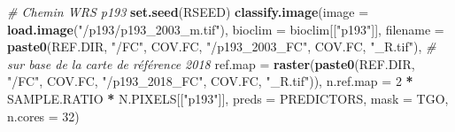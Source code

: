 \documentclass[a4paper, notitlepage, 12pt, krantz2]{krantz}
\newenvironment{Shaded}{\begin{snugshade}}{\end{snugshade}}
\newcommand{\CommentTok}[1]{\textcolor[rgb]{0.56,0.35,0.01}{\textit{#1}}}
\newcommand{\DataTypeTok}[1]{\textcolor[rgb]{0.13,0.29,0.53}{#1}}
\newcommand{\DecValTok}[1]{\textcolor[rgb]{0.00,0.00,0.81}{#1}}
\newcommand{\KeywordTok}[1]{\textcolor[rgb]{0.13,0.29,0.53}{\textbf{#1}}}
\newcommand{\NormalTok}[1]{#1}
\newcommand{\OperatorTok}[1]{\textcolor[rgb]{0.81,0.36,0.00}{\textbf{#1}}}
\newcommand{\StringTok}[1]{\textcolor[rgb]{0.31,0.60,0.02}{#1}}
\begin{document}
\begin{Shaded}
\begin{Highlighting}[]
{{{{{\CommentTok{# Chemin WRS p193}
\KeywordTok{set.seed}\NormalTok{(RSEED)}
\KeywordTok{classify.image}\NormalTok{(}\DataTypeTok{image     =} \KeywordTok{load.image}\NormalTok{(}\StringTok{"/p193/p193_2003_m.tif"}\NormalTok{), }
               \DataTypeTok{bioclim   =}\NormalTok{ bioclim[[}\StringTok{"p193"}\NormalTok{]],}
               \DataTypeTok{filename  =} \KeywordTok{paste0}\NormalTok{(REF.DIR, }\StringTok{"/FC"}\NormalTok{, COV.FC, }\StringTok{"/p193_2003_FC"}\NormalTok{, COV.FC, }\StringTok{"_R.tif"}\NormalTok{),}
               \CommentTok{# sur base de la carte de référence 2018}
               \DataTypeTok{ref.map   =} \KeywordTok{raster}\NormalTok{(}\KeywordTok{paste0}\NormalTok{(REF.DIR, }\StringTok{"/FC"}\NormalTok{, COV.FC, }\StringTok{"/p193_2018_FC"}\NormalTok{, COV.FC, }\StringTok{"_R.tif"}\NormalTok{)),}
               \DataTypeTok{n.ref.map =} \DecValTok{2} \OperatorTok{*}\StringTok{ }\NormalTok{SAMPLE.RATIO }\OperatorTok{*}\StringTok{ }\NormalTok{N.PIXELS[[}\StringTok{"p193"}\NormalTok{]],}
               \DataTypeTok{preds     =}\NormalTok{ PREDICTORS,}
               \DataTypeTok{mask      =}\NormalTok{ TGO,}
               \DataTypeTok{n.cores   =} \DecValTok{32}\NormalTok{)}

}}}}}
\end{Highlighting}
\end{Shaded}
\end{document}

